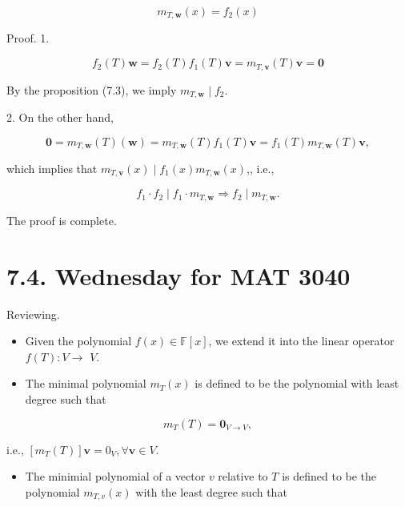 \documentclass[11pt]{article}
\begin{document}
\[
{m}_{T,\mathbf{w}}\left( x\right)  = {f}_2\left( x\right)
\]

Proof. 1.

\[
{f}_2\left( T\right) \mathbf{w} = {f}_2\left( T\right) {f}_1\left( T\right) \mathbf{v} = {m}_{T,\mathbf{v}}\left( T\right) \mathbf{v} = \mathbf{0}
\]

By the proposition (7.3), we imply \({m}_{T,\mathbf{w}} \mid  {f}_2\).

2. On the other hand,

\[
\mathbf{0} = {m}_{T,\mathbf{w}}\left( T\right) \left( \mathbf{w}\right)  = {m}_{T,\mathbf{w}}\left( T\right) {f}_1\left( T\right) \mathbf{v} = {f}_1\left( T\right) {m}_{T,\mathbf{w}}\left( T\right) \mathbf{v},
\]

which implies that \({m}_{T,\mathbf{v}}\left( x\right)  \mid  {f}_1\left( x\right) {m}_{T,\mathbf{w}}\left( x\right)\),, i.e.,

\[
{f}_1 \cdot  {f}_2 \mid  {f}_1 \cdot  {m}_{T,\mathbf{w}} \Rightarrow  {f}_2 \mid  {m}_{T,\mathbf{w}}.
\]

The proof is complete.

\section*{7.4. Wednesday for MAT 3040}

Reviewing.

\begin{itemize}
\item Given the polynomial \(f\left( x\right)  \in  \mathbb{F}\left\lbrack  x\right\rbrack\), we extend it into the linear operator \(f\left( T\right)  : V \rightarrow\)  \(V\).
\end{itemize}

\begin{itemize}
\item The minimal polynomial \({m}_{T}\left( x\right)\) is defined to be the polynomial with least degree such that
\end{itemize}

\[
{m}_{T}\left( T\right)  = {\mathbf{0}}_{V \rightarrow  V},
\]

i.e., \(\left\lbrack  {{m}_{T}\left( T\right) }\right\rbrack  \mathbf{v} = {0}_{V},\forall \mathbf{v} \in  V\).

\begin{itemize}
\item The minimial polynomial of a vector \(v\) relative to \(T\) is defined to be the polynomial \({m}_{T,v}\left( x\right)\) with the least degree such that
\end{itemize}
\end{document}
